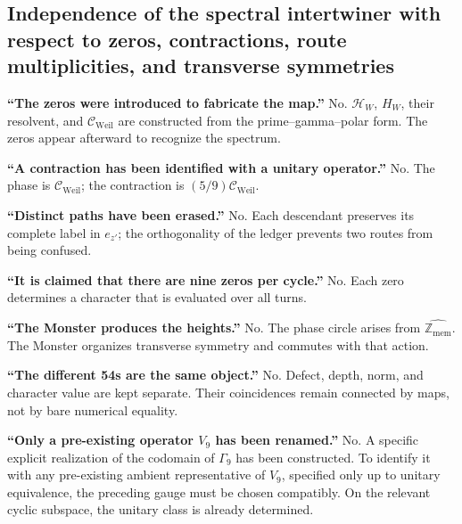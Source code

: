 \subsection{Independence of the spectral intertwiner with respect to zeros, contractions, route multiplicities, and transverse symmetries}
\textbf{“The zeros were introduced to fabricate the map.”} No. \(\mathcal H_W\), \(H_W\), their resolvent, and \(\mathcal C_{\mathrm{Weil}}\) are constructed from the prime–gamma–polar form. The zeros appear afterward to recognize the spectrum.\par
\textbf{“A contraction has been identified with a unitary operator.”} No. The phase is \(\mathcal C_{\mathrm{Weil}}\); the contraction is \((5/9)\mathcal C_{\mathrm{Weil}}\).\par
\textbf{“Distinct paths have been erased.”} No. Each descendant preserves its complete label in \(e_{z'}\); the orthogonality of the ledger prevents two routes from being confused.\par
\textbf{“It is claimed that there are nine zeros per cycle.”} No. Each zero determines a character that is evaluated over all turns.\par
\textbf{“The Monster produces the heights.”} No. The phase circle arises from \(\widehat{\mathbb Z_{\mathrm{mem}}}\). The Monster organizes transverse symmetry and commutes with that action.\par
\textbf{“The different 54s are the same object.”} No. Defect, depth, norm, and character value are kept separate. Their coincidences remain connected by maps, not by bare numerical equality.\par
\textbf{“Only a pre-existing operator \(V_9\) has been renamed.”} No. A specific explicit realization of the codomain of \(\Gamma_9\) has been constructed. To identify it with any pre-existing ambient representative of \(V_9\), specified only up to unitary equivalence, the preceding gauge must be chosen compatibly. On the relevant cyclic subspace, the unitary class is already determined.\par
{}
